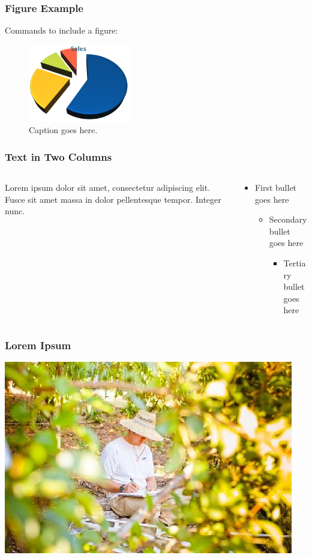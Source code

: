 \documentclass[10pt,xcolor={table,dvipsnames},t]{beamer}
\begin{document}
\begin{frame}
\frametitle{Figure Example}

Commands to include a figure:

\begin{figure}
\includegraphics[width=0.4\textwidth]{chart}
\caption{\label{fig:your-figure}Caption goes here.}
\end{figure}
\end{frame}

\begin{frame}
\frametitle{Text in Two Columns}

\begin{columns}[T]

\begin{column}{0.48\textwidth}
\small
Lorem ipsum dolor sit amet, consectetur adipiscing elit. Fusce sit amet massa in dolor pellentesque tempor. Integer nunc. 
\end{column}

\begin{column}{0.48\textwidth}
\begin{itemize}
\item First bullet goes here
  \begin{itemize}
  \item Secondary bullet goes here
    \begin{itemize}
    \item Tertiary bullet goes here
    \end{itemize}
  \end{itemize}
\end{itemize}
\end{column}

\end{columns}
\end{frame}

\normalframetitle

\begin{frame}
\frametitle{Lorem Ipsum}

\includegraphics[width=.65\textwidth,height=.5\textheight]{photo}

\end{frame}
\end{document}
